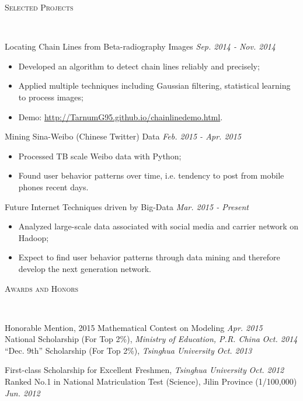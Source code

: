 \documentclass[a4paper, 11pt]{article}
\newenvironment{changemargin}[2]{%
  \begin{list}{}{%
    \setlength{\topsep}{0pt}%
    \setlength{\leftmargin}{#1}%
    \setlength{\rightmargin}{#2}%
    \setlength{\listparindent}{\parindent}%
    \setlength{\itemindent}{\parindent}%
    \setlength{\parsep}{\parskip}%
  }%
  \item[]}{\end{list}
}
\newcommand{\lineover}{
	\begin{changemargin}{-0.05in}{-0.05in}
		\vspace*{-8pt}
		\hrulefill \\
		\vspace*{-2pt}
	\end{changemargin}
}
\newcommand{\header}[1]{
	\begin{changemargin}{-0.5in}{-0.5in}
		\scshape{#1}\\
  	\lineover
	\end{changemargin}
}
\newenvironment{body} {
	\vspace*{-16pt}
	\begin{changemargin}{-0.25in}{-0.5in}
  }	
	{\end{changemargin}
}
\begin{document}
\header{Selected Projects}

\begin{body}
	\vspace{14pt}
	Locating Chain Lines from Beta-radiography Images \hfill \emph{Sep. 2014 - Nov. 2014}
	\begin{itemize}
	\itemsep 0pt
	\item Developed an algorithm to detect chain lines reliably and precisely;
	\item Applied multiple techniques including Gaussian filtering, statistical learning to process images;
	\item Demo: \href{http://TarnumG95.github.io/chainlinedemo.html}{http://TarnumG95.github.io/chainlinedemo.html}.
	\end{itemize}
	\smallskip
	Mining Sina-Weibo (Chinese Twitter) Data \hfill \emph{Feb. 2015 - Apr. 2015}
	\begin{itemize}
	\itemsep 0pt
	\item Processed TB scale Weibo data with Python;
	\item Found user behavior patterns over time, i.e. tendency to post from mobile phones recent days. 
	\end{itemize}
	\smallskip
	Future Internet Techniques driven by Big-Data \hfill \emph{Mar. 2015 - Present}
	\begin{itemize}
	\itemsep 0pt
	\item Analyzed large-scale data associated with social media and carrier network on Hadoop;
	\item Expect to find user behavior patterns through data mining and therefore develop the next generation network. 
	\end{itemize}
	\smallskip

\end{body}
\smallskip

\header{Awards and Honors}

\begin{body}
	\vspace{14pt}
	Honorable Mention, 2015 Mathematical Contest on Modeling \hfill{} \emph{Apr. 2015}\\
	\smallskip
	National Scholarship (For Top 2\%), \emph{Ministry of Education, P.R. China} \hfill{} \emph{Oct. 2014}\\
	\smallskip
	``Dec. 9th'' Scholarship (For Top 2\%), \emph{Tsinghua University} \hfill{} \emph{Oct. 2013}\\
	\smallskip

	First-class Scholarship for Excellent Freshmen, \emph{Tsinghua University} \hfill{} \emph{Oct. 2012}\\
	\smallskip
	Ranked No.1 in National Matriculation Test (Science), Jilin Province (1/100,000) \hfill{} \emph{Jun. 2012}
\end{body}
\end{document}
